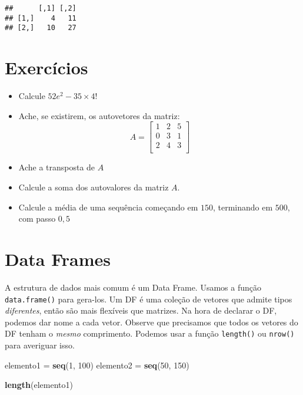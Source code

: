 \documentclass[]{article}
\newenvironment{Shaded}{\begin{snugshade}}{\end{snugshade}}
\newcommand{\DecValTok}[1]{\textcolor[rgb]{0.00,0.00,0.81}{#1}}
\newcommand{\KeywordTok}[1]{\textcolor[rgb]{0.13,0.29,0.53}{\textbf{#1}}}
\newcommand{\NormalTok}[1]{#1}
\newcommand{\StringTok}[1]{\textcolor[rgb]{0.31,0.60,0.02}{#1}}
\providecommand{\tightlist}{%
  \setlength{\itemsep}{0pt}\setlength{\parskip}{0pt}}
\begin{document}
\begin{verbatim}
##      [,1] [,2]
## [1,]    4   11
## [2,]   10   27
\end{verbatim}

\hypertarget{exercicios}{%
\section{Exercícios}\label{exercicios}}

\begin{itemize}
\tightlist
\item
  Calcule \(52e^2 - 35 \times 4!\)
\item
  Ache, se existirem, os autovetores da matriz: \[A = \begin{bmatrix}
  1&2&5\\
  0&3&1\\
  2&4&3\\
  \end{bmatrix}\]
\item
  Ache a transposta de \(A\)
\item
  Calcule a soma dos autovalores da matriz \(A\).
\item
  Calcule a média de uma sequência começando em \(150\), terminando em
  \(500\), com passo \(0,5\)
\end{itemize}

\hypertarget{data-frames}{%
\section{Data Frames}\label{data-frames}}

A estrutura de dados mais comum é um Data Frame. Usamos a função
\texttt{data.frame()} para gera-los. Um DF é uma coleção de vetores que
admite tipos \emph{diferentes}, então são mais flexíveis que matrizes.
Na hora de declarar o DF, podemos dar nome a cada vetor. Observe que
precisamos que todos os vetores do DF tenham o \emph{mesmo} comprimento.
Podemos usar a função \texttt{length()} ou \texttt{nrow()} para
averiguar isso.

\begin{Shaded}
\begin{Highlighting}[]
\NormalTok{elemento1 =}\StringTok{ }\KeywordTok{seq}\NormalTok{(}\DecValTok{1}\NormalTok{, }\DecValTok{100}\NormalTok{)}
\NormalTok{elemento2 =}\StringTok{ }\KeywordTok{seq}\NormalTok{(}\DecValTok{50}\NormalTok{, }\DecValTok{150}\NormalTok{)}

\KeywordTok{length}\NormalTok{(elemento1)}
\end{Highlighting}
\end{Shaded}
\end{document}
